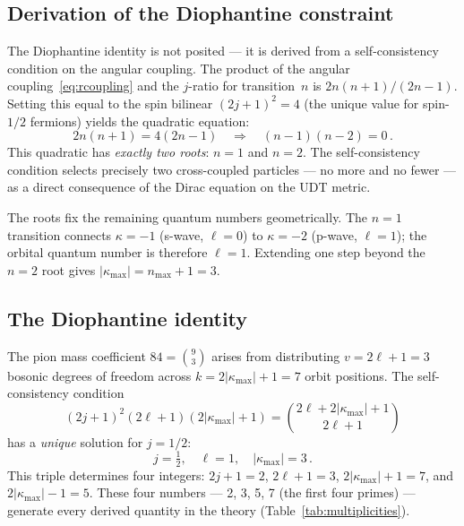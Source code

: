 \documentclass[aps,prd,twocolumn,superscriptaddress,nofootinbib,longbibliography]{revtex4-2}
\newcommand{\kmax}{|\kappa_{\mathrm{max}}|}
\begin{document}
\subsection{Derivation of the Diophantine constraint}

The Diophantine identity is not posited --- it is derived from a
self-consistency condition on the angular coupling.  The product of the
angular coupling~\eqref{eq:rcoupling} and the $j$-ratio for
transition~$n$ is $2n(n+1)/(2n-1)$.  Setting this equal to the spin
bilinear $(2j+1)^2 = 4$ (the unique value for spin-$1/2$ fermions)
yields the quadratic equation:
\begin{equation}\label{eq:quadratic-deriv}
  2n(n+1) = 4(2n-1) \quad\Longrightarrow\quad
  (n-1)(n-2) = 0\,.
\end{equation}
This quadratic has \emph{exactly two roots}: $n=1$ and $n=2$.  The
self-consistency condition selects precisely two cross-coupled
particles --- no more and no fewer --- as a direct consequence of
the Dirac equation on the UDT metric.

The roots fix the remaining quantum numbers geometrically.  The $n=1$
transition connects $\kappa=-1$ (s-wave, $\ell=0$) to $\kappa=-2$
(p-wave, $\ell=1$); the orbital quantum number is therefore $\ell=1$.
Extending one step beyond the $n=2$ root gives
$\kmax = n_{\max}+1 = 3$.

\subsection{The Diophantine identity}

The pion mass coefficient $84 = \binom{9}{3}$ arises from distributing
$v = 2\ell + 1 = 3$ bosonic degrees of freedom across
$k = 2\kmax + 1 = 7$ orbit positions.  The self-consistency condition
\begin{equation}\label{eq:diophantine}
  (2j+1)^2(2\ell+1)(2\kmax+1)
  = \binom{2\ell + 2\kmax + 1}{2\ell+1}
\end{equation}
has a \emph{unique} solution for $j = 1/2$:
\begin{equation}\label{eq:jlk}
  j = \tfrac{1}{2},\quad \ell = 1,\quad \kmax = 3\,.
\end{equation}
This triple determines four integers: $2j+1 = 2$, $2\ell+1 = 3$,
$2\kmax + 1 = 7$, and $2\kmax - 1 = 5$.  These four
numbers --- 2, 3, 5, 7 (the first four primes) --- generate every
derived quantity in the theory (Table~\ref{tab:multiplicities}).
\end{document}
